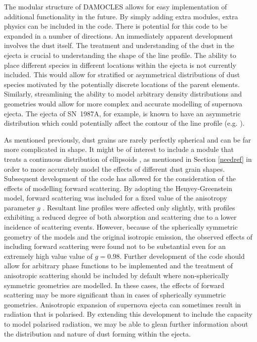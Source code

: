 The modular structure of DAMOCLES allows for easy implementation of additional functionality in the future.  By simply adding extra modules, extra physics can be included in the code.  There is potential for this code to be expanded in a number of directions.  An immediately apparent development involves the dust itself.  The treatment and understanding of the dust in the ejecta is crucial to understanding the shape of the line profile.  The ability to place different species in different locations within the ejecta is not currently included.  This would allow for stratified or asymmetrical distributions of dust species motivated by the potentially discrete locations of the parent elements.  Similarly, streamlining the ability to model arbitrary density distributions and geometries would allow for more complex and accurate modelling of supernova ejecta.  The ejecta of SN~1987A, for example, is known to have an asymmetric distribution which could potentially affect the contour of the line profile (e.g. \citet{Sinnott2013}).

As mentioned previously, dust grains are rarely perfectly spherical and can be far more complicated in shape.  It might be of interest to include a module that treats a continuous distribution of ellipsoids  \citep{Bohren1983}, as mentioned in Section \ref{needref} in order to more accurately model the effects of different dust grain shapes.
%
Subsequent development of the code has allowed for the consideration of the effects of modelling forward scattering.  By adopting the Henyey-Greenstein model, forward scattering was included for a fixed value of the anisotropy parameter $g$ \citep{Henyey1941}.  Resultant line profiles were affected only slightly, with profiles exhibiting a reduced degree of both absorption and scattering due to a lower incidence of scattering events.  However, because of the spherically symmetric geometry of the models and the original isotropic emission, the observed effects of including forward scattering were found not to be substantial even for an extremely high value value of $g = 0.98$.  Further development of the code should allow for arbitrary phase functions to be implemented and the treatment of anisotropic scattering should be included by default where non-spherically symmetric geometries are modelled.  In these cases, the effects of forward scattering may be more significant than in cases of spherically symmetric geometries.  Anisotropic expansion of supernova ejecta can sometimes result in radiation that is polarised.  By extending this development to include the capacity to model polarised radiation, we may be able to glean further information about the distribution and nature of dust forming within the ejecta.  

